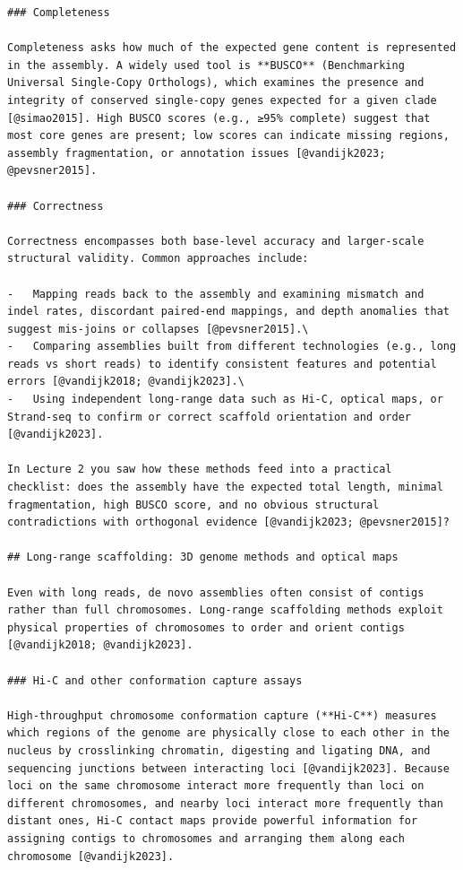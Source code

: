 \documentclass[
  letterpaper,
  DIV=11,
  numbers=noendperiod]{scrreprt}
\begin{document}
\begin{verbatim}
### Completeness

Completeness asks how much of the expected gene content is represented in the assembly. A widely used tool is **BUSCO** (Benchmarking Universal Single‑Copy Orthologs), which examines the presence and integrity of conserved single‑copy genes expected for a given clade [@simao2015]. High BUSCO scores (e.g., ≥95% complete) suggest that most core genes are present; low scores can indicate missing regions, assembly fragmentation, or annotation issues [@vandijk2023; @pevsner2015].

### Correctness

Correctness encompasses both base‑level accuracy and larger‑scale structural validity. Common approaches include:

-   Mapping reads back to the assembly and examining mismatch and indel rates, discordant paired‑end mappings, and depth anomalies that suggest mis‑joins or collapses [@pevsner2015].\
-   Comparing assemblies built from different technologies (e.g., long reads vs short reads) to identify consistent features and potential errors [@vandijk2018; @vandijk2023].\
-   Using independent long‑range data such as Hi‑C, optical maps, or Strand‑seq to confirm or correct scaffold orientation and order [@vandijk2023].

In Lecture 2 you saw how these methods feed into a practical checklist: does the assembly have the expected total length, minimal fragmentation, high BUSCO score, and no obvious structural contradictions with orthogonal evidence [@vandijk2023; @pevsner2015]?

## Long‑range scaffolding: 3D genome methods and optical maps

Even with long reads, de novo assemblies often consist of contigs rather than full chromosomes. Long‑range scaffolding methods exploit physical properties of chromosomes to order and orient contigs [@vandijk2018; @vandijk2023].

### Hi‑C and other conformation capture assays

High‑throughput chromosome conformation capture (**Hi‑C**) measures which regions of the genome are physically close to each other in the nucleus by crosslinking chromatin, digesting and ligating DNA, and sequencing junctions between interacting loci [@vandijk2023]. Because loci on the same chromosome interact more frequently than loci on different chromosomes, and nearby loci interact more frequently than distant ones, Hi‑C contact maps provide powerful information for assigning contigs to chromosomes and arranging them along each chromosome [@vandijk2023].


\end{verbatim}
\end{document}

